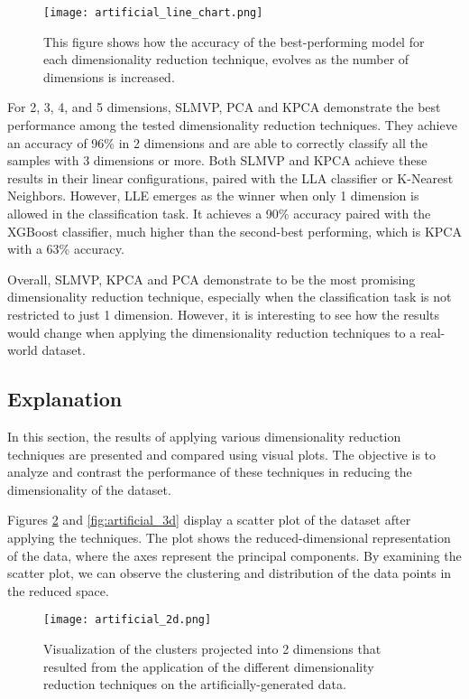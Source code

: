 \begin{figure}[!ht]
    \centering
    \texttt{[image: artificial\_line\_chart.png]}
    \caption{This figure shows how the accuracy of the best-performing model for each dimensionality reduction technique, evolves as the number of dimensions is increased.}
    \label{fig:art_line_chart}
\end{figure}

For 2, 3, 4, and 5 dimensions, SLMVP, PCA and KPCA demonstrate the best performance among the tested dimensionality reduction techniques. They achieve an accuracy of 96\% in 2 dimensions and are able to correctly classify all the samples with 3 dimensions or more. Both SLMVP and KPCA achieve these results in their linear configurations, paired with the LLA classifier or K-Nearest Neighbors.
However, LLE emerges as the winner when only 1 dimension is allowed in the classification task. It achieves a 90\% accuracy paired with the XGBoost classifier, much higher than the second-best performing, which is KPCA with a 63\% accuracy.

Overall, SLMVP, KPCA and PCA demonstrate to be the most promising dimensionality reduction technique, especially when the classification task is not restricted to just 1 dimension. However, it is interesting to see how the results would change when applying the dimensionality reduction techniques to a real-world dataset.

\subsection{Explanation}

In this section, the results of applying various dimensionality reduction techniques are presented and compared using visual plots. The objective is to analyze and contrast the performance of these techniques in reducing the dimensionality of the dataset.

Figures \ref{fig:artificial_2d} and \ref{fig:artificial_3d} display a scatter plot of the dataset after applying the techniques. The plot shows the reduced-dimensional representation of the data, where the axes represent the principal components. By examining the scatter plot, we can observe the clustering and distribution of the data points in the reduced space.

\begin{figure}[!ht]
    \centering
    \texttt{[image: artificial\_2d.png]}
    \caption{Visualization of the clusters projected into 2 dimensions that resulted from the application of the different dimensionality reduction techniques on the artificially-generated data.}
    \label{fig:artificial_2d}
\end{figure}

